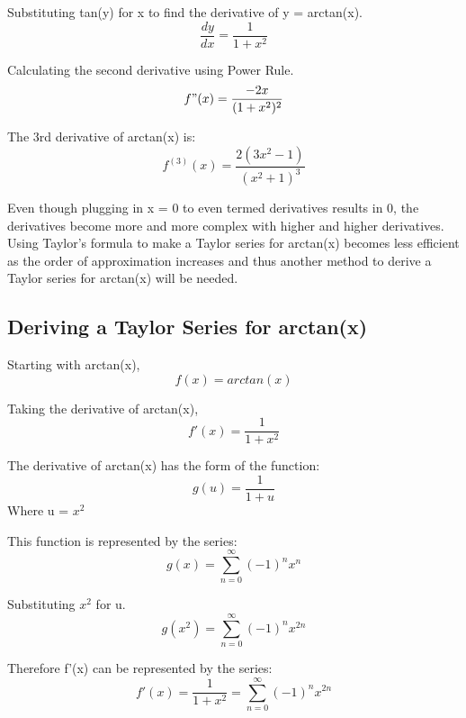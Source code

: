 \documentclass[12pt, titlepage]{article}
\begin{document}
Substituting tan(y) for x to find the derivative of y = arctan(x).
\begin{equation}
 \frac{dy}{dx}  = \frac{1}{1 + x^{2}}
\end{equation}

Calculating the second derivative using Power Rule.
\begin{equation}
    f"(x) = \frac{-2x}{(1+x^{2})^{2}}
\end{equation}

The 3rd derivative of arctan(x) is:
\begin{equation}
    f^{(3)}(x) = \frac{2(3x^{2}-1)}{(x^{2}+1)^{3}}
\end{equation}

Even though plugging in x = 0 to even termed derivatives results in 0, the derivatives become more and more complex with higher and higher derivatives. Using Taylor's formula to make a Taylor series for arctan(x) becomes less efficient as the order of approximation increases and thus another method to derive a Taylor series for arctan(x) will be needed.

\subsection{Deriving a Taylor Series for arctan(x)}
Starting with arctan(x),
\begin{equation}
  f(x) = arctan(x)
\end{equation}

Taking the derivative of arctan(x),
\begin{equation}
f'(x) = \frac{1}{1 + x^{2}}
\end{equation}

The derivative of arctan(x) has the form of the function:
\begin{equation}
    g(u) = \frac{1}{1+u}
\end{equation}
Where u = \(x^2\)

This function is represented by the series:
\begin{equation}
    g(x) = \sum_{n=0}^{\infty} (-1)^{n}x^{n}
\end{equation}

Substituting \(x^{2}\) for u. 
\begin{equation}
    g(x^{2}) = \sum_{n=0}^{\infty} (-1)^{n}x^{2n}
\end{equation}

Therefore f'(x) can be represented by the series:
\begin{equation}
f'(x) = \frac{1}{1 + x^{2}} = \sum_{n=0}^{\infty} (-1)^{n}x^{2n}
\end{equation}
\end{document}
